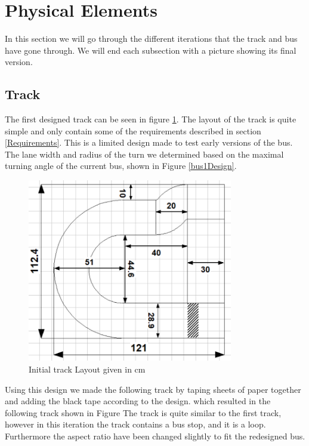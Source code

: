 \section{Physical Elements}
In this section we will go through the different iterations that the track and bus have gone through. We will end each subsection with a picture showing its final version.

\subsection{Track}
The first designed track can be seen in figure \ref{Track1Layout}. The layout of the track is quite simple and only contain some of the requirements described in section \ref{Requirements}. This is a limited design made to test early versions of the bus. The lane width and radius of the turn we determined based on the maximal turning angle of the current bus, shown in Figure \ref{bus1Design}.

\begin{figure}[H]
    \centering
    \includegraphics[width=0.8\textwidth]{Images/Tracks/Track1.PNG}
    \caption{Initial track Layout given in cm}
    \label{Track1Layout}
\end{figure}

Using this design we made the following track by taping sheets of paper together and adding the black tape according to the design. which resulted in the following track shown in Figure 
The track is quite similar to the first track, however in this iteration the track contains a bus stop, and it is a loop. Furthermore the aspect ratio have been changed slightly to fit the redesigned bus.

